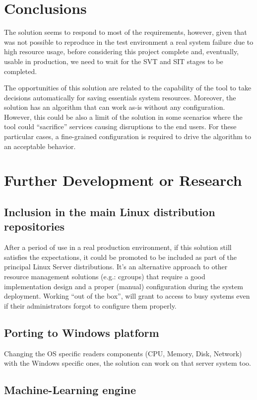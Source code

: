 \documentclass[conference]{IEEEtran}
\begin{document}
\section{Conclusions}
The solution seems to respond to most of the requirements, however, given that was not possible to reproduce in the test environment a real system failure due to high resource usage, before considering this project complete and, eventually, usable in production, we need to wait for the SVT and SIT stages to be completed.

The opportunities of this solution are related to the capability of the tool to take decisions automatically for saving essentials system resources. Moreover, the solution has an algorithm that can work as-is without any configuration. However, this could be also a limit of the solution in some scenarios where the tool could “sacrifice” services causing disruptions to the end users. For these particular cases, a fine-grained configuration is required to drive the algorithm to an acceptable behavior.

\section{Further Development or Research}

\subsection{Inclusion in the main Linux distribution repositories}

After a period of use in a real production environment, if this solution still satisfies the expectations, it could be promoted to be included as part of the principal Linux Server distributions. It’s an alternative approach to other resource management solutions (e.g.: cgroups) that require a good implementation design and a proper (manual) configuration during the system deployment. Working “out of the box”, will grant to access to busy systems even if their administrators forgot to configure them properly.

\subsection{Porting to Windows platform}

Changing the OS specific readers components (CPU, Memory, Disk, Network) with the Windows specific ones, the solution can work on that server system too.

\subsection{Machine-Learning engine}
\end{document}

